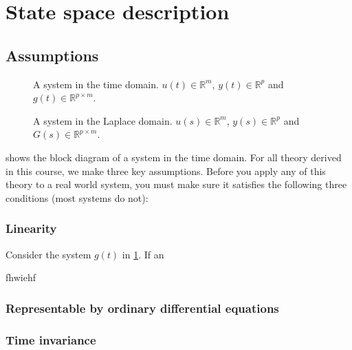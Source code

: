 \documentclass[a4paper,12pt]{article}
\begin{document}
\section{State space description}
\subsection{Assumptions}
\begin{figure}[H]
  \centering
  \caption{A system in the time domain. $u(t) \in \mathbb{R}^m$, $y(t) \in \mathbb{R}^p$ and $g(t) \in \mathbb{R}^{p \times m}$.}
  \label{fig:simpleSystemTime}
\end{figure}

\begin{figure}[H]
  \centering
  \caption{A system in the Laplace domain. $u(s) \in \mathbb{R}^m$, $y(s) \in \mathbb{R}^p$ and $G(s) \in \mathbb{R}^{p \times m}$.}
  \label{fig:simpleSystemLaplace}
\end{figure}
 shows the block diagram of a system in the time domain. For all theory derived in this course, we make three key assumptions. Before you apply any of this theory to a real world system, you must make sure it satisfies the following three conditions (most systems do not):
\subsubsection{Linearity}
Consider the system $g(t)$ in \cref{fig:simpleSystemTime}. If an

fhwiehf
\subsubsection{Representable by ordinary differential equations}

\subsubsection{Time invariance}
\end{document}
